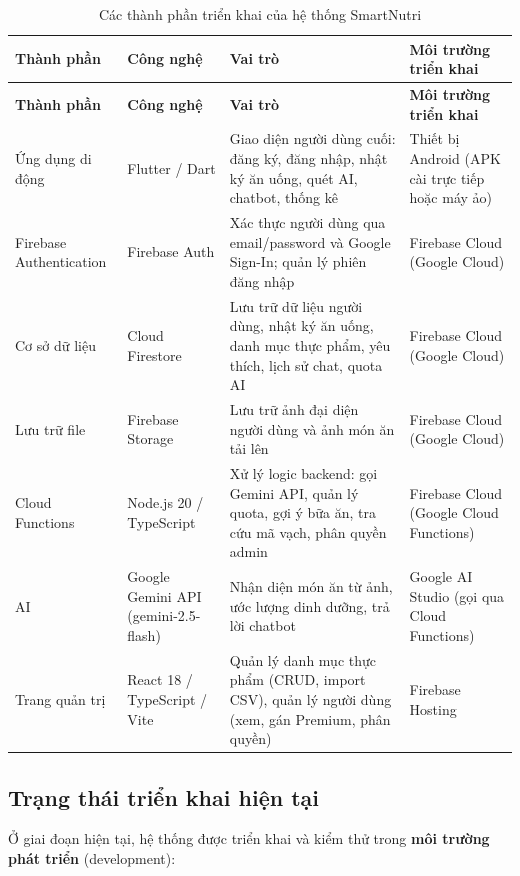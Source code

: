 \begin{longtable}{|p{3cm}|p{3cm}|p{5cm}|p{3.5cm}|}
    \caption{Các thành phần triển khai của hệ thống SmartNutri}
    \label{tab:deployment} \\
    \hline
    \textbf{Thành phần} & \textbf{Công nghệ} & \textbf{Vai trò} & \textbf{Môi trường triển khai} \\
    \hline
    \endfirsthead
    \hline
    \textbf{Thành phần} & \textbf{Công nghệ} & \textbf{Vai trò} & \textbf{Môi trường triển khai} \\
    \hline
    \endhead
    \hline
    \endfoot
    Ứng dụng di động & Flutter / Dart & Giao diện người dùng cuối: đăng ký, đăng nhập, nhật ký ăn uống, quét AI, chatbot, thống kê & Thiết bị Android (APK cài trực tiếp hoặc máy ảo) \\
    \hline
    Firebase Authentication & Firebase Auth & Xác thực người dùng qua email/password và Google Sign-In; quản lý phiên đăng nhập & Firebase Cloud (Google Cloud) \\
    \hline
    Cơ sở dữ liệu & Cloud Firestore & Lưu trữ dữ liệu người dùng, nhật ký ăn uống, danh mục thực phẩm, yêu thích, lịch sử chat, quota AI & Firebase Cloud (Google Cloud) \\
    \hline
    Lưu trữ file & Firebase Storage & Lưu trữ ảnh đại diện người dùng và ảnh món ăn tải lên & Firebase Cloud (Google Cloud) \\
    \hline
    Cloud Functions & Node.js 20 / TypeScript & Xử lý logic backend: gọi Gemini API, quản lý quota, gợi ý bữa ăn, tra cứu mã vạch, phân quyền admin & Firebase Cloud (Google Cloud Functions) \\
    \hline
    AI & Google Gemini API (gemini-2.5-flash) & Nhận diện món ăn từ ảnh, ước lượng dinh dưỡng, trả lời chatbot & Google AI Studio (gọi qua Cloud Functions) \\
    \hline
    Trang quản trị & React 18 / TypeScript / Vite & Quản lý danh mục thực phẩm (CRUD, import CSV), quản lý người dùng (xem, gán Premium, phân quyền) & Firebase Hosting \\
    \hline
\end{longtable}

\subsection{Trạng thái triển khai hiện tại}

Ở giai đoạn hiện tại, hệ thống được triển khai và kiểm thử trong \textbf{môi trường phát triển} (development):

